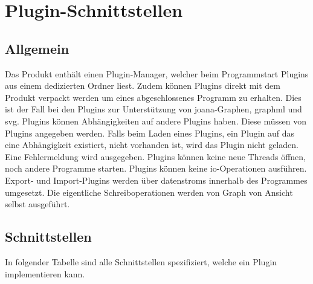 \chapter{Plugin-Schnittstellen}
\label{ch:plugschnitt}

\setcounter{psnr}{10}
\newcommand{\psno}{\ifnum\value{psnr}<10 00\else\ifnum\value{psnr}<100 0\fi\fi\arabic{psnr}}
\newcommand\ps[2]{\namedlabel{s:#1}{/S\psno/}\addtocounter{psnr}{10}: & #2 \\ [1ex] }

\section{Allgemein}

Das Produkt enthält einen Plugin-Manager, welcher beim Programmstart Plugins aus einem dedizierten Ordner liest.
Zudem können Plugins direkt mit dem Produkt verpackt werden um eines abgeschlossenes Programm zu erhalten.
Dies ist der Fall bei den Plugins zur Unterstützung von \gls{joana}-Graphen, \gls{graphml} und \gls{svg}.
Plugins können Abhängigkeiten auf andere Plugins haben. Diese müssen von Plugins angegeben werden.
Falls beim Laden eines Plugins, ein Plugin auf das eine Abhängigkeit existiert, nicht vorhanden ist, wird das Plugin
nicht geladen. Eine Fehlermeldung wird ausgegeben.
Plugins können keine neue Threads öffnen, noch andere Programme starten. Plugins können keine \gls{io}-Operationen ausführen.
Export- und Import-Plugins werden über \glspl{datenstrom} innerhalb des Programmes umgesetzt. Die eigentliche Schreiboperationen
werden von Graph von Ansicht selbst ausgeführt.\\

\section{Schnittstellen}
In folgender Tabelle sind alle Schnittstellen spezifiziert, welche ein Plugin implementieren kann.

